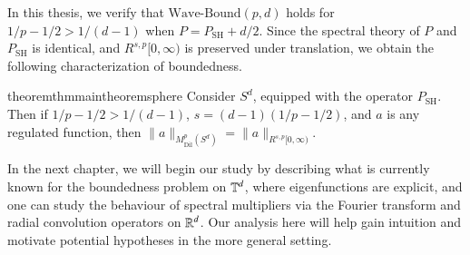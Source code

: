 In this thesis, we verify that $\text{Wave-Bound}(p,d)$ holds for $1/p - 1/2 > 1/(d-1)$ when $P = P_{\text{SH}} + d/2$. Since the spectral theory of $P$ and $P_{\text{SH}}$ is identical, and $R^{s,p}[0,\infty)$ is preserved under translation, we obtain the following characterization of boundedness.

\begin{restatable}{theorem}{thmmaintheoremsphere} \label{maintheoremsphere}
  Consider $S^d$, equipped with the operator $P_{\text{SH}}$. Then if $1/p - 1/2 > 1/(d-1)$, $s = (d-1)(1/p - 1/2)$, and $a$ is any regulated function, then $\|a \|_{M^p_{\text{Dil}}(S^d)} = \| a \|_{R^{s,p}[0,\infty)}$.
\end{restatable}


In the next chapter, we will begin our study by describing what is currently known for the boundedness problem on $\operatorname{\mathbb{T}}^d$, where eigenfunctions are explicit, and one can study the behaviour of spectral multipliers via the Fourier transform and radial convolution operators on $\operatorname{\mathbb{R}}^d$. Our analysis here will help gain intuition and motivate potential hypotheses in the more general setting.


%

